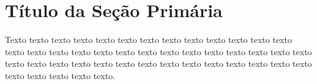 \chapter{Título da Seção Primária}

Texto texto texto texto texto texto texto texto texto texto texto texto texto texto
texto texto texto texto texto texto texto texto texto texto texto texto texto texto texto
texto texto texto texto texto texto texto texto texto texto texto texto texto texto texto
texto texto.